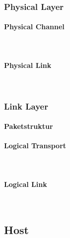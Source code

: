 \documentclass[doktyp=barbeit]{TUBAFarbeiten}
\begin{document}
		\subsubsection{Physical Layer}

			\paragraph{Physical Channel} \mbox{} \vspace{0.2cm} \\
				

			\paragraph{Physical Link} \mbox{} \vspace{0.2cm} \\
				

		\subsubsection{Link Layer}

			\paragraph{Paketstruktur}
				

			\paragraph{Logical Transport} \mbox{} \vspace{0.2cm} \\
				

			\paragraph{Logical Link} \mbox{} \vspace{0.2cm} \\
				

	\subsection{Host}
		
\end{document}
